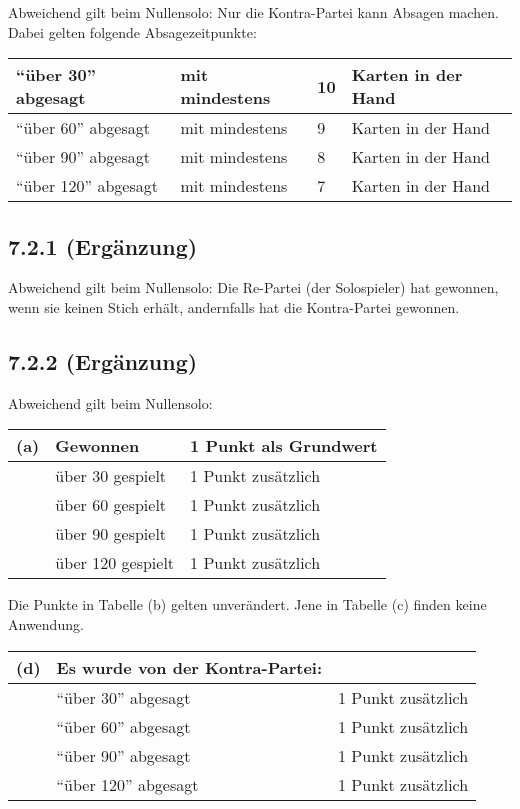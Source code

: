 Abweichend gilt beim Nullensolo: Nur die Kontra-Partei kann Absagen 
machen. Dabei gelten folgende Absagezeitpunkte: 

\begin{tabular}{ | l | l | l | l | }
  \hline			
	``über 30'' abgesagt	& mit mindestens & 10	& Karten in der Hand \\ \hline
	``über 60'' abgesagt	& mit mindestens & 9	& Karten in der Hand \\ \hline
	``über 90'' abgesagt	& mit mindestens & 8	& Karten in der Hand \\ \hline
	``über 120'' abgesagt	& mit mindestens & 7	& Karten in der Hand \\ \hline
  \hline  
\end{tabular}

\subsection*{7.2.1 (Ergänzung)}

Abweichend gilt beim Nullensolo: Die Re-Partei (der Solospieler) hat 
gewonnen, wenn sie keinen Stich erhält, andernfalls hat die 
Kontra-Partei gewonnen. 


\subsection*{7.2.2 (Ergänzung)}

Abweichend gilt beim Nullensolo:

\begin{tabular}{ | l | l | l | }
  \hline
	(a)	& Gewonnen			& 1 Punkt als Grundwert \\ \hline
		& über 30 gespielt	& 1 Punkt zusätzlich \\ \hline
		& über 60 gespielt	& 1 Punkt zusätzlich \\ \hline
		& über 90 gespielt	& 1 Punkt zusätzlich \\ \hline
		& über 120 gespielt	& 1 Punkt zusätzlich \\ \hline
  \hline  
\end{tabular}

Die Punkte in Tabelle (b) gelten unverändert. Jene in Tabelle (c) 
finden keine Anwendung. 


\begin{tabular}{ | l | l | l | }
  \hline
	(d)	& Es wurde von der Kontra-Partei: & \\ \hline
		& ``über 30'' abgesagt	& 1 Punkt zusätzlich \\ \hline
		& ``über 60'' abgesagt	& 1 Punkt zusätzlich \\ \hline
		& ``über 90'' abgesagt	& 1 Punkt zusätzlich \\ \hline
		& ``über 120'' abgesagt	& 1 Punkt zusätzlich \\ \hline
  \hline  
\end{tabular}

